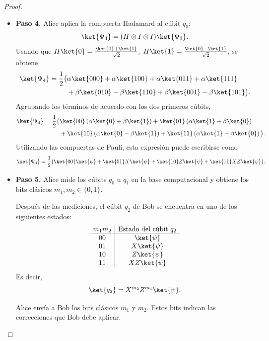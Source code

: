 \documentclass[a4,10pt]{aleph-notas}
\begin{document}
\begin{proof}
\begin{itemize}
        \item \textbf{Paso 4.} Alice aplica la compuerta Hadamard al cúbit \(q_0\):
        \[
            \ket{\Psi_4}=(H\otimes I\otimes I)\ket{\Psi_3}.
        \]
        Usando que
        $
            H\ket{0}=\frac{\ket{0}+\ket{1}}{\sqrt{2}},
            $ $H\ket{1}=\frac{\ket{0}-\ket{1}}{\sqrt{2}},
        $
        se obtiene
        \begin{align*}
            \ket{\Psi_4}=\frac{1}{2}\big(&\alpha\ket{000}+\alpha\ket{100}+\alpha\ket{011}+\alpha\ket{111}\\
            &+\beta\ket{010}-\beta\ket{110}+\beta\ket{001}-\beta\ket{101}\big).
        \end{align*}
        Agrupando los términos de acuerdo con los dos primeros cúbits,
        \begin{align*}
            \ket{\Psi_4}=\frac{1}{2}\big(&\ket{00}\left(\alpha\ket{0}+\beta\ket{1}\right)+\ket{01}\left(\alpha\ket{1}+\beta\ket{0}\right)\\
            &+\ket{10}\left(\alpha\ket{0}-\beta\ket{1}\right)+\ket{11}\left(\alpha\ket{1}-\beta\ket{0}\right)\big).
        \end{align*}
        Utilizando las compuertas de Pauli, esta expresión puede escribirse como
        \[
            \ket{\Psi_4}=\frac{1}{2}\big(\ket{00}\ket{\psi}+\ket{01}X\ket{\psi}+\ket{10}Z\ket{\psi}+\ket{11}XZ\ket{\psi}\big).
        \]

        \item \textbf{Paso 5.} Alice mide los cúbits \(q_0\) u $q_1$ en la base computacional y obtiene los bits clásicos \(m_1,m_2\in\{0,1\}\).

        Después de las mediciones, el cúbit \(q_2\) de Bob se encuentra en uno de los siguientes estados:
        \[
            \begin{array}{c|c}
                m_1m_2 & \text{Estado del cúbit }q_2\\
                \hline
                00 & \ket{\psi}\\
                01 & X\ket{\psi}\\
                10 & Z\ket{\psi}\\
                11 & XZ\ket{\psi}
            \end{array}
        \]
        Es decir,
        \[
            \ket{q_2}=X^{m_2}Z^{m_1}\ket{\psi}.
        \]

        Alice envía a Bob los bits clásicos \(m_1\) y \(m_2\). Estos bits indican las correcciones que Bob debe aplicar.


\end{itemize}
\end{proof}
\end{document}
